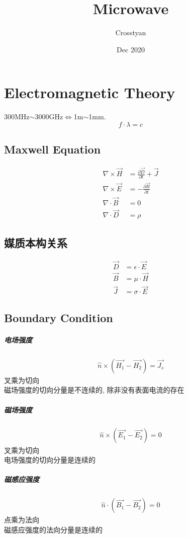 \documentclass[a4paper]{report}
\title{Microwave}
\author{Crosstyan}
\date{Dec 2020}
\begin{document}
\chapter{Electromagnetic Theory}
300MHz$\sim$3000GHz$\Leftrightarrow$1m$\sim$1mm. 
$$f\cdot \lambda=c$$
\section{Maxwell Equation}
\begin{align*}
   \nabla \times \vec{H}&=\frac{\partial \vec{D}}{\partial t}+\vec{J}
 \\ \nabla \times \vec{E}&=-\frac{\partial \vec{B}}{\partial t}
  \\ \nabla \cdot \vec{B}&=0
  \\ \nabla \cdot \vec{D}&=\rho
\end{align*}
\section{媒质本构关系}
\begin{align*}
  \vec{D}&=\epsilon\cdot \vec{E}
  \\ \vec{B}&=\mu\cdot\vec{H}
  \\ \vec{J}&=\sigma\cdot \vec{E}
\end{align*}
\section{Boundary Condition}
\paragraph{电场强度}
\begin{align*}
  \hat{n}\times (\vec{H_1}-\vec{H_2})=\vec{J_s}
\end{align*}
叉乘为切向\\
磁场强度的切向分量是不连续的, 除非没有表面电流的存在
\paragraph{磁场强度}
\begin{align*}
  \hat{n}\times (\vec{E_1}-\vec{E_2})=0
\end{align*}
叉乘为切向\\
电场强度的切向分量是连续的
\paragraph{磁感应强度}
\begin{align*}
  \hat{n}\cdot (\vec{B_1}-\vec{B_2})=0
\end{align*}
点乘为法向\\
磁感应强度的法向分量是连续的
\end{document}
